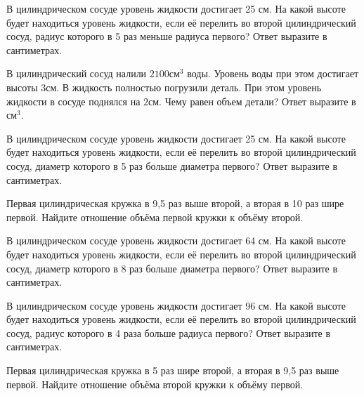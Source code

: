 \documentclass[4apaper]{article}
\begin{document}
\begin{taskBN}{79}
В цилиндрическом сосуде уровень жидкости достигает 25 см. На какой высоте будет находиться уровень жидкости, если её перелить во второй цилиндрический сосуд, радиус которого в 5 раз меньше радиуса первого? Ответ выразите в сантиметрах.
\end{taskBN}

\begin{taskBN}{80}
В цилиндрический сосуд налили $2100\mbox{см}^3$ воды. Уровень воды при этом достигает высоты $3$см. В жидкость полностью погрузили деталь. При этом уровень жидкости в сосуде поднялся на $2$см. Чему равен объем детали? Ответ выразите в $\mbox{см}^3$.
\end{taskBN}

\begin{taskBN}{81}
В цилиндрическом сосуде уровень жидкости достигает 25 см. На какой высоте будет находиться уровень жидкости, если её перелить во второй цилиндрический сосуд, диаметр которого в 5 раз больше диаметра первого? Ответ выразите в сантиметрах.
\end{taskBN}

\begin{taskBN}{82}
 Первая цилиндрическая кружка в 9,5 раз выше второй, а вторая в 10 раз шире первой. Найдите отношение объёма первой кружки к объёму второй.
\end{taskBN}

\begin{taskBN}{83}
В цилиндрическом сосуде уровень жидкости достигает 64 см. На какой высоте будет находиться уровень жидкости, если её перелить во второй цилиндрический сосуд, диаметр которого в 8 раз больше диаметра первого? Ответ выразите в сантиметрах.
\end{taskBN}

\begin{taskBN}{84}
В цилиндрическом сосуде уровень жидкости достигает 96 см. На какой высоте будет находиться уровень жидкости, если её перелить во второй цилиндрический сосуд, радиус которого в 4 раза больше радиуса первого? Ответ выразите в сантиметрах.
\end{taskBN}

\begin{taskBN}{85}
 Первая цилиндрическая кружка в 5 раз шире второй, а вторая в 9,5 раз выше первой. Найдите отношение объёма второй кружки к объёму первой.
\end{taskBN}
\end{document}
